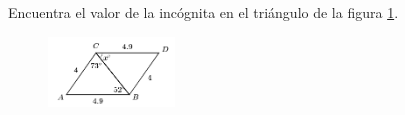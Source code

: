 \question[10]  Encuentra el valor de la incógnita en el triángulo de la figura \ref{fig:angle_triangle_06}.
\begin{figure}[H]
    \begin{center}
        \includegraphics[width=0.3\textwidth]{../images/angle_triangle_06.png}
    \end{center}
    \caption{}
    \label{fig:angle_triangle_06}
\end{figure}
